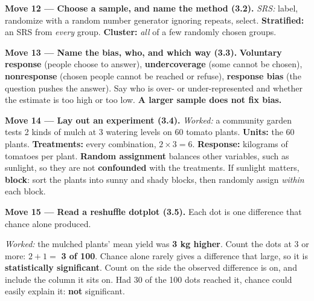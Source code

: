 \documentclass[12pt]{article}
\begin{document}
\vspace{3pt}
\textbf{Move 12 --- Choose a sample, and name the method (3.2).} \emph{SRS:} label, randomize
with a random number generator ignoring repeats, select. \textbf{Stratified:} an SRS from
\emph{every} group. \textbf{Cluster:} \emph{all} of a few randomly chosen groups.

\vspace{3pt}
\textbf{Move 13 --- Name the bias, who, and which way (3.3).} \textbf{Voluntary response}
(people choose to answer), \textbf{undercoverage} (some cannot be chosen), \textbf{nonresponse}
(chosen people cannot be reached or refuse), \textbf{response bias} (the question pushes the
answer). Say who is over- or under-represented and whether the estimate is too high or too low.
\textbf{A larger sample does not fix bias.}

\vspace{3pt}
\boxguard[6]
\textbf{Move 14 --- Lay out an experiment (3.4).} \emph{Worked:} a community garden tests 2
kinds of mulch at 3 watering levels on 60 tomato plants. \textbf{Units:} the 60 plants.
\textbf{Treatments:} every combination, $2 \times 3 = 6$. \textbf{Response:} kilograms of
tomatoes per plant. \textbf{Random assignment} balances other variables, such as sunlight, so
they are not \textbf{confounded} with the treatments. If sunlight matters, \textbf{block}: sort
the plants into sunny and shady blocks, then randomly assign \emph{within} each block.

\vspace{3pt}
\boxguard[14]
\textbf{Move 15 --- Read a reshuffle dotplot (3.5).} Each dot is one difference that chance alone
produced.

\vspace{2pt}
\noindent\begin{minipage}[c]{0.44\linewidth}\raggedright
\emph{Worked:} the mulched plants' mean yield was \textbf{3 kg higher}. Count the dots at 3 or
more: $2 + 1 =$ \textbf{3 of 100}. Chance alone rarely gives a difference that large, so it
is \textbf{statistically significant}. Count on the side the observed difference is on, and
include the column it sits on. Had 30 of the 100 dots reached it, chance could easily explain
it: \textbf{not} significant.
\end{minipage}\hfill
\begin{minipage}[c]{0.53\linewidth}\centering
{}
\end{minipage}
\end{document}
